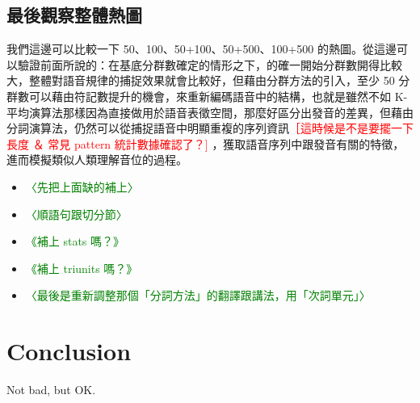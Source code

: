 \subsection{最後觀察整體熱圖}

        我們這邊可以比較一下 50、100、50+100、50+500、100+500 的熱圖。從這邊可以驗證前面所說的：在基底分群數確定的情形之下，的確一開始分群數開得比較大，整體對語音規律的捕捉效果就會比較好，但藉由分群方法的引入，至少 50 分群數可以藉由符記數提升的機會，來重新編碼語音中的結構，也就是雖然不如 K-平均演算法那樣因為直接做用於語音表徵空間，那麼好區分出發音的差異，但藉由分詞演算法，仍然可以從捕捉語音中明顯重複的序列資訊\textcolor{red}{［這時候是不是要擺一下長度 ＆ 常見 pattern 統計數據確認了？] } ，獲取語音序列中跟發音有關的特徵，進而模擬類似人類理解音位的過程。

\begin{itemize}
    \item \textcolor{green}{〈先把上面缺的補上〉 }
    \item \textcolor{green}{〈順語句跟切分節〉 }
    \item \textcolor{green}{《補上 stats 嗎？》 }
    \item \textcolor{green}{《補上 triunits 嗎？》 }
    \item \textcolor{green}{〈最後是重新調整那個「分詞方法」的翻譯跟講法，用「次詞單元」〉 }
\end{itemize}

\section{Conclusion}

        Not bad, but OK.
